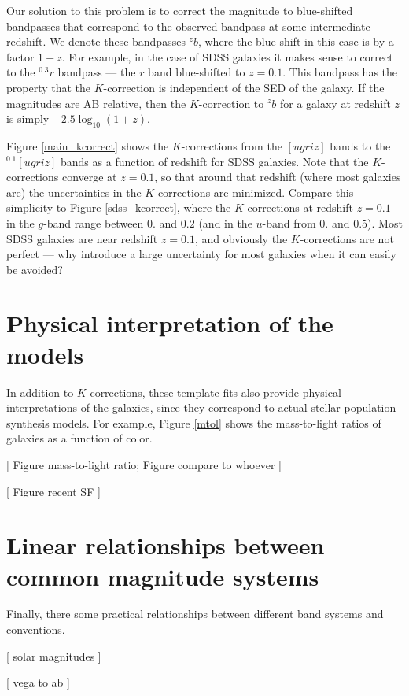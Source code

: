 \documentclass[10pt,preprint]{aastex}
\newcommand{\band}[2]{\ensuremath{^{{#1}}\!{#2}}}
\begin{document}
Our solution to this problem is to correct the magnitude to
blue-shifted bandpasses that correspond to the observed bandpass at
some intermediate redshift. We denote these bandpasses \band{z}{b},
where the blue-shift in this case is by a factor $1+z$. For example,
in the case of SDSS galaxies it makes sense to correct to the
\band{0.3}{r} bandpass --- the $r$ band blue-shifted to $z=0.1$. This
bandpass has the property that the $K$-correction is independent of
the SED of the galaxy. If the magnitudes are AB relative, then the
$K$-correction to \band{z}{b} for a galaxy at redshift $z$ is simply
$-2.5\log_{10} (1+z)$.

Figure \ref{main_kcorrect} shows the $K$-corrections from the
$[ugriz]$ bands to the $\band{0.1}{[ugriz]}$ bands as a function of
redshift for SDSS galaxies. Note that the $K$-corrections converge at
$z=0.1$, so that around that redshift (where most galaxies are) the
uncertainties in the $K$-corrections are minimized. Compare this
simplicity to Figure \ref{sdss_kcorrect}, where the $K$-corrections at
redshift $z=0.1$ in the $g$-band range between $0.$ and $0.2$ (and in
the $u$-band from $0.$ and $0.5$). Most SDSS galaxies are near
redshift $z=0.1$, and obviously the $K$-corrections are not perfect
--- why introduce a large uncertainty for most galaxies when it can
easily be avoided?

\section{Physical interpretation of the models}

In addition to $K$-corrections, these template fits also provide
physical interpretations of the galaxies, since they correspond to
actual stellar population synthesis models. For example, 
Figure \ref{mtol} shows the mass-to-light ratios of galaxies as a
function of color.


[ Figure mass-to-light ratio; Figure compare to whoever ]

[ Figure recent SF ]

\section{Linear relationships between common magnitude systems}

Finally, there some practical relationships between different band
systems and conventions.

[ solar magnitudes ]

[ vega to ab ]
\end{document}
